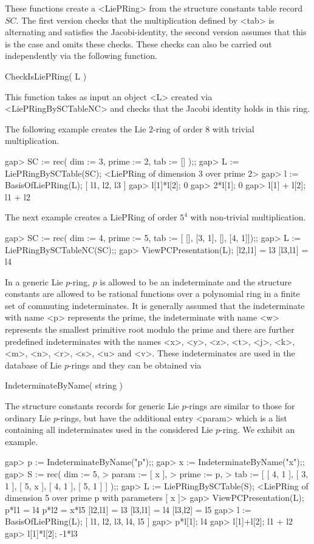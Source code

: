 These functions create a <LiePRing> from the structure constants table
record $SC$. The first version checks that the multiplication defined by
<tab> is alternating and satisfies the Jacobi-identity, the second version
assumes that this is the case and omits these checks. These checks can
also be carried out independently via the following function.

\> CheckIsLiePRing( L )

This function takes as input an object <L> created via <LiePRingBySCTableNC>
and checks that the Jacobi identity holds in this ring.

The following example creates the Lie $2$-ring of order $8$ with trivial 
multiplication.  

\beginexample
gap> SC := rec( dim := 3, prime := 2, tab := [] );;
gap> L := LiePRingBySCTable(SC);
<LiePRing of dimension 3 over prime 2>
gap> l := BasisOfLiePRing(L);
[ l1, l2, l3 ]
gap> l[1]*l[2];
0
gap> 2*l[1];
0
gap> l[1] + l[2];
l1 + l2
\endexample

The next example creates a LiePRing of order $5^4$ with non-trivial 
multiplication.

\beginexample
gap> SC := rec( dim := 4, prime := 5, tab := [ [], [3, 1], [], [4, 1]]);;
gap> L := LiePRingBySCTableNC(SC);;
gap> ViewPCPresentation(L);
[l2,l1] = l3
[l3,l1] = l4
\endexample


In a generic Lie $p$-ring, $p$ is allowed to be an indeterminate and 
the structure constants are allowed to be rational functions over a 
polynomial ring in a finite set of 
commuting indeterminates. It is generally assumed that the indeterminate
with name <p> represents the prime, the indeterminate with name <w> 
represents the smallest primitive root modulo the prime and there are 
further predefined indeterminates with the names <x>, <y>, <z>, <t>, 
<j>, <k>, <m>, <n>, <r>, <s>, <u> and <v>. These indeterminates are used 
in the database of Lie $p$-rings and they can be obtained via

\> IndeterminateByName( string )

The structure constants records for generic Lie $p$-rings are similar to
those for ordinary Lie $p$-rings, but have the additional entry <param>
which is a list containing all indeterminates used in the considered Lie
$p$-ring. We exhibit an example.

\beginexample
gap> p := IndeterminateByName("p");;
gap> x := IndeterminateByName("x");;
gap> S := rec( dim := 5, 
>              param := [ x ], 
>              prime := p, 
>              tab := [ [ 4, 1 ], [ 3, 1 ], [ 5, x ], [ 4, 1 ], [ 5, 1 ] ] );;
gap> L := LiePRingBySCTable(S);
<LiePRing of dimension 5 over prime p with parameters [ x ]>
gap> ViewPCPresentation(L);
p*l1 = l4
p*l2 = x*l5
[l2,l1] = l3
[l3,l1] = l4
[l3,l2] = l5
gap> l := BasisOfLiePRing(L);
[ l1, l2, l3, l4, l5 ]
gap> p*l[1];
l4
gap> l[1]+l[2];
l1 + l2
gap> l[1]*l[2];
-1*l3
\endexample

